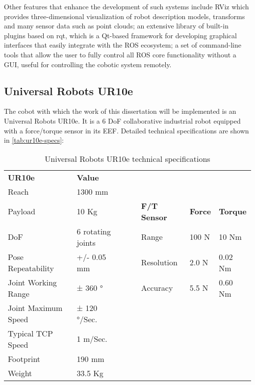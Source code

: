 \par Other features that enhance the development of such systems include RViz which provides three-dimensional visualization of robot description models, transforms and many sensor data such as point clouds; an extensive library of built-in plugins based on rqt, which is a Qt-based framework for developing graphical interfaces that easily integrate with the ROS ecosystem; a set of command-line tools that allow the user to fully control all ROS core functionality without a GUI, useful for controlling the cobotic system remotely.

\subsection{Universal Robots UR10e}

\par The cobot with which the work of this dissertation will be implemented is an Universal Robots UR10e. It is a 6 DoF collaborative industrial robot equipped with a force/torque sensor in its EEF. Detailed technical specifications are shown in \autoref{tab:ur10e-specs}: 

\begin{table}[]
    \centering
    \begin{tabular}{|l|l|lllll}
    \cline{1-2}
    \textbf{UR10e} & \textbf{Value} &  &  &  &  &  \\ \cline{1-2}
    Reach & 1300 mm &  &  &  &  &  \\ \cline{1-2} \cline{5-7} 
    Payload & 10 Kg &  & \multicolumn{1}{l|}{} & \multicolumn{1}{l|}{\textbf{F/T Sensor}} & \multicolumn{1}{l|}{\textbf{Force}} & \multicolumn{1}{l|}{\textbf{Torque}} \\ \cline{1-2} \cline{5-7} 
    DoF & 6 rotating joints &  & \multicolumn{1}{l|}{} & \multicolumn{1}{l|}{Range} & \multicolumn{1}{l|}{100 N} & \multicolumn{1}{l|}{10 Nm} \\ \cline{1-2} \cline{5-7} 
    Pose Repeatability & +/- 0.05 mm &  & \multicolumn{1}{l|}{} & \multicolumn{1}{l|}{Resolution} & \multicolumn{1}{l|}{2.0 N} & \multicolumn{1}{l|}{0.02 Nm} \\ \cline{1-2} \cline{5-7} 
    Joint Working Range & ± 360 ° &  & \multicolumn{1}{l|}{} & \multicolumn{1}{l|}{Accuracy} & \multicolumn{1}{l|}{5.5 N} & \multicolumn{1}{l|}{0.60 Nm} \\ \cline{1-2} \cline{5-7} 
    Joint Maximum Speed & ± 120 °/Sec. &  &  &  &  &  \\ \cline{1-2}
    Typical TCP Speed & 1 m/Sec. &  &  &  &  &  \\ \cline{1-2}
    Footprint & 190 mm &  &  &  &  &  \\ \cline{1-2}
    Weight & 33.5 Kg &  &  &  &  &  \\ \cline{1-2}
    \end{tabular}
    \caption{Universal Robots UR10e technical specifications}
    \label{tab:ur10e-specs}
\end{table}

